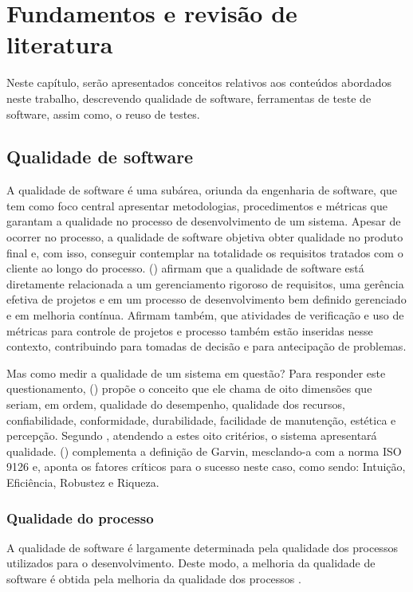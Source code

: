 \documentclass[tg]{mdtufsm}
\begin{document}
\chapter{Fundamentos e revisão de literatura}

Neste capítulo, serão apresentados conceitos relativos aos conteúdos abordados neste trabalho, descrevendo qualidade de software, ferramentas de teste de software, assim como, o reuso de testes.

\section{Qualidade de software}

A qualidade de software é uma subárea, oriunda da engenharia de software, que tem como foco central apresentar metodologias,
procedimentos e métricas que garantam a qualidade no processo de desenvolvimento de um sistema. Apesar de ocorrer no processo, a qualidade de software
objetiva obter qualidade no produto final e, com isso, conseguir contemplar na totalidade os requisitos tratados com o cliente ao longo do processo.
\citeauthor{de2006introduccao} (\citeyear{de2006introduccao}) afirmam que a qualidade de software está diretamente relacionada a um gerenciamento
rigoroso de requisitos, uma gerência efetiva de projetos e em um processo de desenvolvimento bem definido gerenciado e em melhoria contínua. Afirmam também,
que atividades de verificação e uso de métricas para controle de projetos e processo também estão inseridas nesse contexto, contribuindo para tomadas de
decisão e para antecipação de problemas.

Mas como medir a qualidade de um sistema em questão? Para responder este questionamento, \citeauthor{garvin1987competing} (\citeyear{garvin1987competing}) propõe o conceito que ele chama de
oito dimensões que seriam, em ordem, qualidade do desempenho, qualidade dos recursos, confiabilidade, conformidade, durabilidade, facilidade de manutenção,
estética e percepção. Segundo \citeauthor{garvin1987competing}, atendendo a estes oito critérios, o sistema apresentará qualidade.
\citeauthor{pressman2011engenharia} (\citeyear{pressman2011engenharia}) complementa a definição de Garvin, mesclando-a com a norma ISO 9126 e, aponta os fatores
críticos para o sucesso neste caso, como sendo: Intuição, Eficiência, Robustez e Riqueza.

\subsection{Qualidade do processo}
A qualidade de software é largamente determinada pela qualidade dos processos utilizados para o desenvolvimento. Deste modo, a melhoria
da qualidade de software é obtida pela melhoria da qualidade dos processos \cite{koscianski2007qualidade}.
\end{document}
